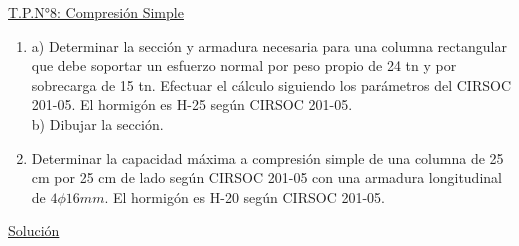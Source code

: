 \begin{center}
\underline{\Large{T.P.N°8: Compresión Simple}}
\end{center}

\begin{enumerate}
\item a) Determinar la sección y armadura necesaria para una columna rectangular que debe soportar un esfuerzo normal por peso propio de 24 tn y por sobrecarga de 15 tn. Efectuar el cálculo siguiendo los parámetros del CIRSOC 201-05. El hormigón es H-25 según CIRSOC 201-05.\\
b) Dibujar la sección.

\item Determinar la capacidad máxima a compresión simple de una columna de 25 cm por 25 cm de lado según CIRSOC 201-05 con una armadura longitudinal de $4 \phi 16mm$. El hormigón es H-20 según CIRSOC 201-05.
\end{enumerate}

\begin{center}
\underline{\Large{Solución}}
\end{center}

